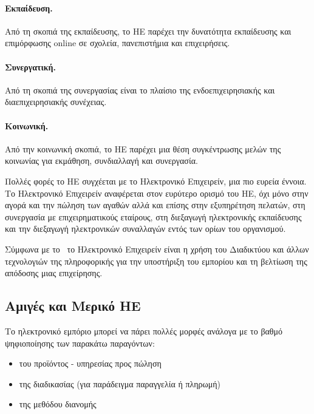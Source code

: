 \documentclass[12pt]{report}
\begin{document}
  \paragraph{Εκπαίδευση.} Από τη σκοπιά της εκπαίδευσης, το ΗΕ παρέχει την δυνατότητα εκπαίδευσης και επιμόρφωσης \textlatin{online} σε σχολεία, πανεπιστήμια και επιχειρήσεις.
  \paragraph{Συνεργατική.} Από τη σκοπιά της συνεργασίας είναι το πλαίσιο της ενδοεπιχειρησιακής και διαεπιχειρησιακής συνέχειας.
  \paragraph{Κοινωνική.} Από την κοινωνική σκοπιά, το ΗΕ παρέχει μια θέση συγκέντρωσης μελών της κοινωνίας για εκμάθηση, συνδιαλλαγή και συνεργασία.

Πολλές φορές το ΗΕ συγχέεται με το Ηλεκτρονικό Επιχειρείν, μια πιο ευρεία έννοια. Το Ηλεκτρονικό Επιχειρείν αναφέρεται στον ευρύτερο ορισμό του ΗΕ, όχι μόνο στην αγορά και την πώληση των αγαθών αλλά και επίσης στην εξυπηρέτηση πελατών, στη συνεργασία με επιχειρηματικούς εταίρους, στη διεξαγωγή ηλεκτρονικής εκπαίδευσης και την διεξαγωγή ηλεκτρονικών συναλλαγών εντός των ορίων του οργανισμού.

Σύμφωνα με το~\cite{chen_2005} το Ηλεκτρονικό Επιχειρείν είναι η χρήση του Διαδικτύου και άλλων τεχνολογιών της πληροφορικής για την υποστήριξη του εμπορίου και τη βελτίωση της απόδοσης μιας επιχείρησης.

\subsection{Αμιγές και Μερικό ΗΕ}
Το ηλεκτρονικό εμπόριο μπορεί να πάρει πολλές μορφές ανάλογα με το βαθμό ψηφιοποίησης των παρακάτω παραγόντων:
\begin{itemize}
  \item του προϊόντος - υπηρεσίας προς πώληση
  \item της διαδικασίας (για παράδειγμα παραγγελία ή πληρωμή)
  \item της μεθόδου διανομής
\end{itemize}
\end{document}

